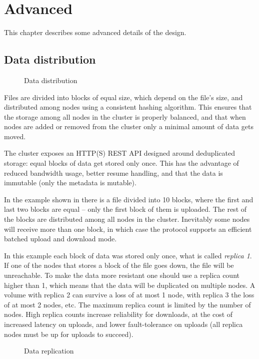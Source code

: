 \chapter{Advanced}
This chapter describes some advanced details of the \SX design.

\section{Data distribution}

\begin{figure}
	\centering
	
	\caption{Data distribution}
	\label{fig:dist}
\end{figure}

Files are divided into blocks of equal size, which depend on the file's size,
and distributed among \SX nodes using a consistent hashing algorithm. This
ensures that the storage among all nodes in the cluster is properly balanced,
and that when nodes are added or removed from the cluster only a minimal amount
of data gets moved.

The cluster exposes an HTTP(S) REST API designed around deduplicated storage:
equal blocks of data get stored only once. This has the advantage of reduced
bandwidth usage, better resume handling, and that the data is immutable (only
the metadata is mutable).

In the example shown in  there is a file divided into 10 blocks,
where the first and last two blocks are equal -- only the first block of them
is uploaded. The rest of the blocks are distributed among all nodes in the
cluster. Inevitably some nodes will receive more than one block, in which case
the protocol supports an efficient batched upload and download mode.

In this example each block of data was stored only once, what is called
\emph{replica 1}. If one of the nodes that stores a block of the file goes down,
the file will be unreachable. To make the data more resistant one should
use a replica count higher than 1, which means that the data will be
duplicated on multiple nodes. A volume with replica 2 can survive a loss of
at most 1 node, with replica 3 the loss of at most 2 nodes, etc. The maximum
replica count is limited by the number of nodes. High replica counts increase
reliability for downloads, at the cost of increased latency on uploads, and
lower fault-tolerance on uploads (all replica nodes must be up for uploads to
succeed).

\begin{figure}
	\centering
	
	\caption{Data replication}
	\label{fig:replication}
\end{figure}

